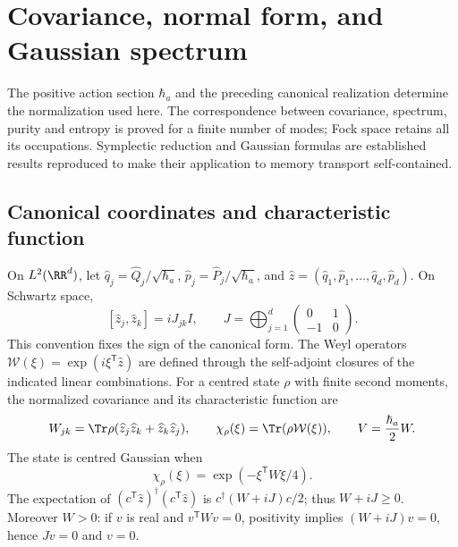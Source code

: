\chapter{Covariance, normal form, and Gaussian spectrum}
\label{x_reciprocidad:app:gaussianas-espectro}

The positive action section \(\hbar_a\) and the preceding canonical
realization determine the normalization used here. The
correspondence between covariance, spectrum, purity and entropy is proved for a
finite number of modes; Fock space retains all its occupations.
Symplectic reduction and Gaussian formulas are established
results reproduced to make their application to memory
transport self-contained.

\section{Canonical coordinates and characteristic function}
On \(L^2(\RR^d)\), let \(\widehat q_j=\widehat Q_j/\sqrt{\hbar_a}\), \(\widehat p_j=\widehat P_j/\sqrt{\hbar_a}\), and \(\widehat z=(\widehat q_1,\widehat p_1,\ldots,\widehat q_d,\widehat p_d)\). On Schwartz space,
\[
 [\widehat z_j,\widehat z_k]=iJ_{jk}I,\qquad
 J=\bigoplus_{j=1}^d\begin{pmatrix}0&1\\-1&0\end{pmatrix}.
\]
This convention fixes the sign of the canonical form. The Weyl operators \(\mathcal W(\xi)=\exp(i\xi^{\mathsf T}\widehat z)\) are defined through the self-adjoint closures of the indicated linear combinations. For a centred state \(\rho\) with finite second moments, the normalized covariance and its characteristic function are
\[
 W_{jk}=\Tr\rho(\widehat z_j\widehat z_k+\widehat z_k\widehat z_j),
 \qquad \chi_\rho(\xi)=\Tr(\rho\mathcal W(\xi)),\qquad
 V=\frac{\hbar_a}{2}W.
\]
The state is centred Gaussian when
\begin{equation}
 \chi_\rho(\xi)=\exp(-\xi^{\mathsf T}W\xi/4).
 \label{x_reciprocidad:app:eq:caracteristica-gaussiana}
\end{equation}
The expectation of \((c^{\mathsf T}\widehat z)^\dagger
(c^{\mathsf T}\widehat z)\) is \(c^\dagger(W+iJ)c/2\); thus
\(W+iJ\geq0\). Moreover \(W>0\): if \(v\) is real and
\(v^{\mathsf T}Wv=0\), positivity implies \((W+iJ)v=0\),
hence \(Jv=0\) and \(v=0\).


